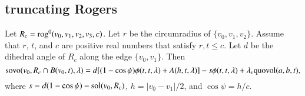 %
%
%
%

\subsection{truncating Rogers}

\begin{lemma}
Let $R_c={\operatorname{rog}}^0(v_0,v_1,v_2,v_3,c)$.  Let $r$ be the
circumradius of $\{v_0,v_1,v_2\}$.  Assume that $r$, $t$,
and $c$ are positive real numbers that satisfy $r, t\le c$.
Let $d$ be the dihedral angle of $R_c$ along the edge $\{v_0,v_1\}$.
Then
   $$
   {\operatorname{sovo}}(v_0,R_c\cap B(v_0,t),\lambda) = 
   d [(1-\cos\psi)\phi(t,t,\lambda)+A(h,t,\lambda)]
   -s \phi(t,t,\lambda) + \lambda_v {\operatorname{quovol}}(a,b,t),
   $$
where $s = d (1-\cos\psi) - \operatorname{sol}(v_0,R_c)$,   $h=|v_0-v_1|/2$,
and $\cos\psi = h/c$.
\end{lemma}

